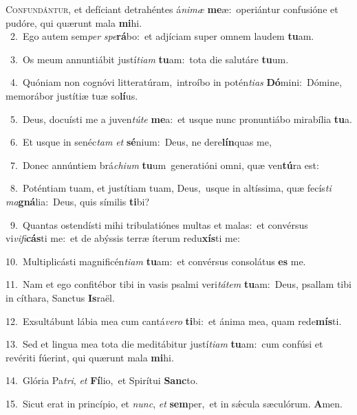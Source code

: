 \lettrine{\initial\textcolor{\initialcolor}{C}}{onfundántur,} et defíciant detrahéntes á\-\textit{ni}\-\textit{mæ} \textbf{me}\-æ:~\star operiántur confusióne et pudóre, qui quærunt mala \textbf{mi}\-hi.\\
{\numbfont\textcolor{\numbcolor}{~2.}}~Ego autem sem\textit{per} \textit{spe}\-\textbf{rá}bo:~\star et adjíciam super omnem laudem \textbf{tu}\-am.\par
{\numbfont\textcolor{\numbcolor}{~3.}}~Os meum annuntiábit justí\-\textit{ti}\-\textit{am} \textbf{tu}\-am:~\star tota die salutáre \textbf{tu}\-um.\par
{\numbfont\textcolor{\numbcolor}{~4.}}~Quóniam non cognóvi litteratúram,~\dagger introíbo in potén\-\textit{ti}\-\textit{as} \textbf{Dó}\-mini:~\star Dómine, memorábor justítiæ tuæ so\-\textbf{lí}\-us.\par
{\numbfont\textcolor{\numbcolor}{~5.}}~Deus, docuísti me a juven\-\textit{tú}\-\textit{te} \textbf{me}\-a:~\star et usque nunc pronuntiábo mirabília \textbf{tu}\-a.\par
{\numbfont\textcolor{\numbcolor}{~6.}}~Et usque in senéc\textit{tam} \textit{et} \textbf{sé}\-nium:~\star Deus, ne dere\-\textbf{lín}\-quas me,\par
{\numbfont\textcolor{\numbcolor}{~7.}}~Donec annúntiem brá\-\textit{chi}\-\textit{um} \textbf{tu}\-um~\star generatióni omni, quæ ven\-\textbf{tú}\-ra est:\par
{\numbfont\textcolor{\numbcolor}{~8.}}~Poténtiam tuam, et justítiam tuam, Deus,~\dagger usque in altíssima, quæ fecís\textit{ti} \textit{ma}\-\textbf{gná}lia:~\star Deus, quis símilis \textbf{ti}\-bi?\par
{\numbfont\textcolor{\numbcolor}{~9.}}~Quantas ostendísti mihi tribulatiónes multas et malas:~\dagger et convérsus vi\-\textit{vi}\-\textit{fi}\textbf{cás}ti me:~\star et de abýssis terræ íterum redu\-\textbf{xís}\-ti me:\par
{\numbfont\textcolor{\numbcolor}{10.}}~Multiplicásti magnificén\-\textit{ti}\-\textit{am} \textbf{tu}\-am:~\star et convérsus consolátus \textbf{es} me.\par
{\numbfont\textcolor{\numbcolor}{11.}}~Nam et ego confitébor tibi in vasis psalmi veri\-\textit{tá}\-\textit{tem} \textbf{tu}\-am:~\star Deus, psallam tibi in cíthara, Sanctus \textbf{Is}\-raël.\par
{\numbfont\textcolor{\numbcolor}{12.}}~Exsultábunt lábia mea cum cantá\-\textit{ve}\-\textit{ro} \textbf{ti}\-bi:~\star et ánima mea, quam rede\-\textbf{mís}\-ti.\par
{\numbfont\textcolor{\numbcolor}{13.}}~Sed et lingua mea tota die meditábitur justí\-\textit{ti}\-\textit{am} \textbf{tu}\-am:~\star cum confúsi et revériti fúerint, qui quærunt mala \textbf{mi}\-hi.\par
{\numbfont\textcolor{\numbcolor}{14.}}~Glória Pa\-\textit{tri}\-, \textit{et} \textbf{Fí}\-lio,~\star et Spirítui \textbf{Sanc}\-to.\par
{\numbfont\textcolor{\numbcolor}{15.}}~Sicut erat in princípio, et \textit{nunc}\-, \textit{et} \textbf{sem}\-per,~\star et in sǽcula sæculórum. \textbf{A}\-men.\par
